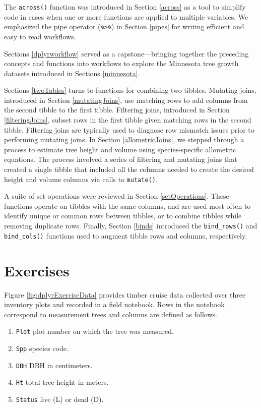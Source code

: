 \documentclass[
  11pt,
]{krantz}
\providecommand{\tightlist}{%
  \setlength{\itemsep}{0pt}\setlength{\parskip}{0pt}}
\theoremstyle{definition}
\theoremstyle{definition}
\theoremstyle{definition}
\theoremstyle{definition}
\theoremstyle{remark}
\begin{document}
The \texttt{across()} function was introduced in Section \ref{across} as a tool to simplify code in cases when one or more functions are applied to multiple variables. We emphasized the pipe operator (\texttt{\%\textgreater{}\%}) in Section \ref{pipes} for writing efficient and easy to read workflows.

Sections \ref{dplyrworkflow} served as a capstone---bringing together the preceding concepts and functions into workflows to explore the Minnesota tree growth datasets introduced in Sections \ref{minnesota}.

Sections \ref{twoTables} turns to functions for combining two tibbles. Mutating joins, introduced in Section \ref{mutatingJoins}, use matching rows to add columns from the second tibble to the first tibble. Filtering joins, introduced in Section \ref{filteringJoins}, subset rows in the first tibble given matching rows in the second tibble. Filtering joins are typically used to diagnose row mismatch issues prior to performing mutating joins. In Section \ref{allometricJoins}, we stepped through a process to estimate tree height and volume using species-specific allometric equations. The process involved a series of filtering and mutating joins that created a single tibble that included all the columns needed to create the desired height and volume columns via calls to \texttt{mutate()}.

A suite of set operations were reviewed in Section \ref{setOperations}. These functions operate on tibbles with the same columns, and are used most often to identify unique or common rows between tibbles, or to combine tibbles while removing duplicate rows. Finally, Section \ref{binds} introduced the \texttt{bind\_rows()} and \texttt{bind\_cols()} functions used to augment tibble rows and columns, respectively.

\hypertarget{exercisesDplyr}{%
\section{Exercises}\label{exercisesDplyr}}

Figure \ref{fig:dplyrExerciseData} provides timber cruise data collected over three inventory plots and recorded in a field notebook. Rows in the notebook correspond to measurement trees and columns are defined as follows.

\begin{enumerate}
\def\labelenumi{\arabic{enumi}.}
\tightlist
\item
  \texttt{Plot} plot number on which the tree was measured.
\item
  \texttt{Spp} species code.
\item
  \texttt{DBH} DBH in centimeters.
\item
  \texttt{Ht} total tree height in meters.
\item
  \texttt{Status} live (L) or dead (D).
\end{enumerate}
\end{document}
